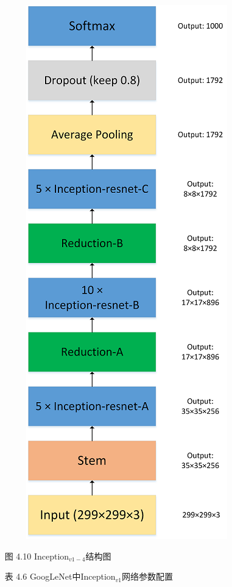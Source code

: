 \begin{figure}
\centering
\includegraphics{./img/ch4/image63.png}
\caption{}
\end{figure}

​ 图 4.10 Inception\(_{v1-4}\)结构图

​ 表 4.6 GoogLeNet中Inception\(_{v1}\)网络参数配置

